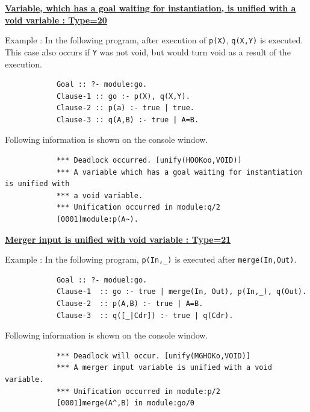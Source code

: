 \noindent\underline{\bf
Variable, which has a goal waiting for instantiation, is unified with
a void variable : Type=20}
\vspace{1ex}\par
Example : In the following program, after execution of \verb|p(X)|,
\verb|q(X,Y)| is executed. This case also occurs if \verb|Y| was not void,
but would turn void as a result of the execution.
\begin{verbatim}
            Goal :: ?- module:go.
            Clause-1 :: go :- p(X), q(X,Y).
            Clause-2 :: p(a) :- true | true.
            Clause-3 :: q(A,B) :- true | A=B.
\end{verbatim}\par
Following information is shown on the console window.
\begin{verbatim}
            *** Deadlock occurred. [unify(HOOKoo,VOID)]
            *** A variable which has a goal waiting for instantiation is unified with
            *** a void variable.
            *** Unification occurred in module:q/2
            [0001]module:p(A~).
\end{verbatim}
\vspace{1ex}

\noindent\underline{\bf
Merger input is unified with void variable : Type=21}
\vspace{1ex}\par
Example : In the following program, \verb|p(In,_)| is executed after \verb|merge(In,Out)|.
\begin{verbatim}
            Goal :: ?- moduel:go.
            Clause-1  :: go :- true | merge(In, Out), p(In,_), q(Out).
            Clause-2  :: p(A,B) :- true | A=B.
            Clause-3  :: q([_|Cdr]) :- true | q(Cdr).
\end{verbatim}\par
Following information is shown on the console window.
\begin{verbatim}
            *** Deadlock will occur. [unify(MGHOKo,VOID)]
            *** A merger input variable is unified with a void variable.
            *** Unification occurred in module:p/2
            [0001]merge(A^,B) in module:go/0
\end{verbatim}
\vspace{1ex}

